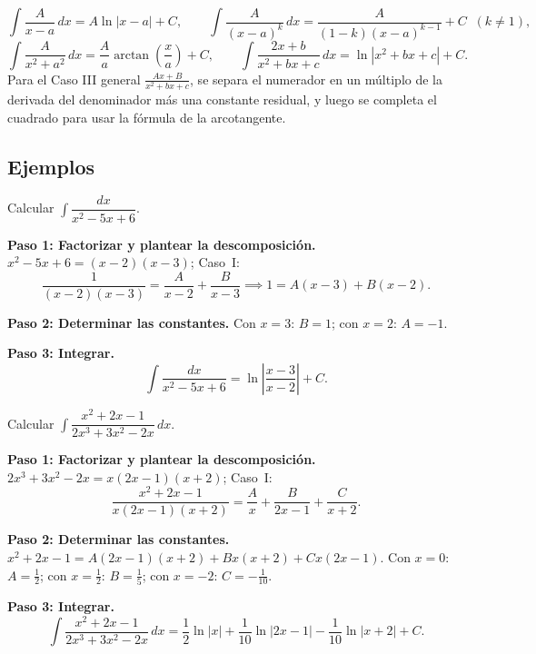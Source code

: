 \[
\int\frac{A}{x-a}\,dx = A\ln|x-a|+C, \qquad
\int\frac{A}{(x-a)^k}\,dx = \frac{A}{(1-k)(x-a)^{k-1}}+C \;\;(k\neq 1),
\]
\[
\int\frac{A}{x^2+a^2}\,dx = \frac{A}{a}\arctan\!\left(\frac{x}{a}\right)+C,
\qquad
\int\frac{2x+b}{x^2+bx+c}\,dx = \ln|x^2+bx+c|+C.
\]
Para el Caso III general $\frac{Ax+B}{x^2+bx+c}$, se separa el numerador en
un múltiplo de la derivada del denominador más una constante residual, y
luego se completa el cuadrado para usar la fórmula de la arcotangente.

\subsection{Ejemplos}

\begin{example}
Calcular $\displaystyle\int\dfrac{dx}{x^2-5x+6}$.

\begin{myproof}

\textbf{Paso 1: Factorizar y plantear la descomposición.}
$x^2-5x+6=(x-2)(x-3)$; Caso~I:
\[
\frac{1}{(x-2)(x-3)}=\frac{A}{x-2}+\frac{B}{x-3}
\implies 1=A(x-3)+B(x-2).
\]

\textbf{Paso 2: Determinar las constantes.}
Con $x=3$: $B=1$; con $x=2$: $A=-1$.

\textbf{Paso 3: Integrar.}
\[
\boxed{\int\frac{dx}{x^2-5x+6}=\ln\left|\frac{x-3}{x-2}\right|+C.}
\]
\end{myproof}
\end{example}

\begin{example}
Calcular $\displaystyle\int\dfrac{x^2+2x-1}{2x^3+3x^2-2x}\,dx$.

\begin{myproof}

\textbf{Paso 1: Factorizar y plantear la descomposición.}
$2x^3+3x^2-2x=x(2x-1)(x+2)$; Caso~I:
\[
\frac{x^2+2x-1}{x(2x-1)(x+2)}=\frac{A}{x}+\frac{B}{2x-1}+\frac{C}{x+2}.
\]

\textbf{Paso 2: Determinar las constantes.}
$x^2+2x-1=A(2x-1)(x+2)+Bx(x+2)+Cx(2x-1)$.
Con $x=0$: $A=\tfrac{1}{2}$; con $x=\tfrac{1}{2}$: $B=\tfrac{1}{5}$; con $x=-2$: $C=-\tfrac{1}{10}$.

\textbf{Paso 3: Integrar.}
\[
\boxed{\int\frac{x^2+2x-1}{2x^3+3x^2-2x}\,dx
=\frac{1}{2}\ln|x|+\frac{1}{10}\ln|2x-1|-\frac{1}{10}\ln|x+2|+C.}
\]
\end{myproof}
\end{example}

